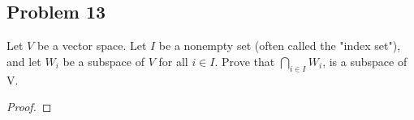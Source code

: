 \subsection*{Problem 13}
Let $V$ be a vector space. Let $I$ be a nonempty set (often called the "index set"), and let $W_i$ be a subspace of $V$ for all $i \in I$. Prove that $\displaystyle \bigcap_{i \in I} W_i$, is a subspace of V.
\begin{proof}

\end{proof}

